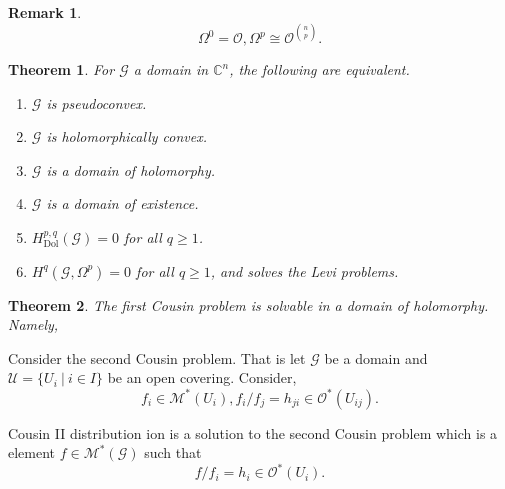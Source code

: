 \documentclass{article}
\newtheorem{theorem}{Theorem} [section]
\newtheorem{remark}{Remark}[section]
\DeclareMathOperator{\Dol}{Dol}
\newcommand{\sU}[0]{\mathscr{U}}
\newcommand{\C}[0]{\mathbb{C}}
\newcommand{\G}[0]{\mathcal{G}}
\newcommand{\sep}[0]{\:|\:}
\newcommand{\Ouv}[0]{\mathcal{O}}
\begin{document}
\begin{remark}
  \begin{equation*}
    \Omega^0=\Ouv,\Omega^p \cong \Ouv^{{n\choose p}}.
  \end{equation*}
\end{remark}

\begin{theorem}
  For $\G$ a domain in $\C^n$, the following are equivalent.
  \begin{enumerate}[1).]
    \item $\G$ is pseudoconvex.
    \item $\G$ is holomorphically convex.
    \item $\G$ is a domain of holomorphy.
    \item $\G$ is a domain of existence.
    \item $H^{p,q}_{\Dol}(\G)=0$ for all $q\geq1$.
    \item $H^q(\G,\Omega^p)=0$ for all $q\geq1$, and solves the Levi problems.
  \end{enumerate}
\end{theorem}

\begin{theorem}
  The first Cousin problem is solvable in a domain of holomorphy. Namely,
  \begin{center}
  \end{center}
\end{theorem}

Consider the second Cousin problem. That is let $\G$ be a domain and $\sU=\{U_i\sep i\in I\}$ be an open covering. Consider,
\begin{equation*}
  f_i\in\mathcal{M}^*(U_i), f_i/f_j = h_{ji}\in\Ouv^*(U_{ij}).
\end{equation*}

Cousin II distribution ion is a solution to the second Cousin problem which is a element $f\in\mathcal{M}^*(\G)$ such that 
\begin{equation*}
  f/f_i = h_i\in\Ouv^*(U_i).
\end{equation*}
\end{document}
